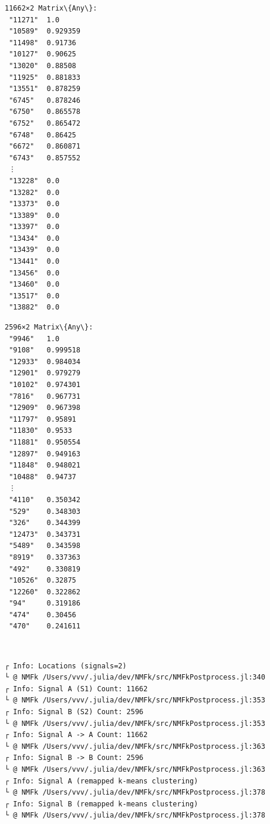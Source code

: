 \documentclass[11pt]{article}
\begin{document}
    \begin{Verbatim}[commandchars=\\\{\}]

    \end{Verbatim}

    
    \begin{Verbatim}[commandchars=\\\{\}]
11662×2 Matrix\{Any\}:
 "11271"  1.0
 "10589"  0.929359
 "11498"  0.91736
 "10127"  0.90625
 "13020"  0.88508
 "11925"  0.881833
 "13551"  0.878259
 "6745"   0.878246
 "6750"   0.865578
 "6752"   0.865472
 "6748"   0.86425
 "6672"   0.860871
 "6743"   0.857552
 ⋮        
 "13228"  0.0
 "13282"  0.0
 "13373"  0.0
 "13389"  0.0
 "13397"  0.0
 "13434"  0.0
 "13439"  0.0
 "13441"  0.0
 "13456"  0.0
 "13460"  0.0
 "13517"  0.0
 "13882"  0.0
    \end{Verbatim}

    
    
    \begin{Verbatim}[commandchars=\\\{\}]
2596×2 Matrix\{Any\}:
 "9946"   1.0
 "9108"   0.999518
 "12933"  0.984034
 "12901"  0.979279
 "10102"  0.974301
 "7816"   0.967731
 "12909"  0.967398
 "11797"  0.95891
 "11830"  0.9533
 "11881"  0.950554
 "12897"  0.949163
 "11848"  0.948021
 "10488"  0.94737
 ⋮        
 "4110"   0.350342
 "529"    0.348303
 "326"    0.344399
 "12473"  0.343731
 "5489"   0.343598
 "8919"   0.337363
 "492"    0.330819
 "10526"  0.32875
 "12260"  0.322862
 "94"     0.319186
 "474"    0.30456
 "470"    0.241611
    \end{Verbatim}

    
    \begin{center}
    \end{center}
    { \hspace*{\fill} \\}
    
    \begin{Verbatim}[commandchars=\\\{\}]
┌ Info: Locations (signals=2)
└ @ NMFk /Users/vvv/.julia/dev/NMFk/src/NMFkPostprocess.jl:340
┌ Info: Signal A (S1) Count: 11662
└ @ NMFk /Users/vvv/.julia/dev/NMFk/src/NMFkPostprocess.jl:353
┌ Info: Signal B (S2) Count: 2596
└ @ NMFk /Users/vvv/.julia/dev/NMFk/src/NMFkPostprocess.jl:353
┌ Info: Signal A -> A Count: 11662
└ @ NMFk /Users/vvv/.julia/dev/NMFk/src/NMFkPostprocess.jl:363
┌ Info: Signal B -> B Count: 2596
└ @ NMFk /Users/vvv/.julia/dev/NMFk/src/NMFkPostprocess.jl:363
┌ Info: Signal A (remapped k-means clustering)
└ @ NMFk /Users/vvv/.julia/dev/NMFk/src/NMFkPostprocess.jl:378
┌ Info: Signal B (remapped k-means clustering)
└ @ NMFk /Users/vvv/.julia/dev/NMFk/src/NMFkPostprocess.jl:378
    \end{Verbatim}
\end{document}
